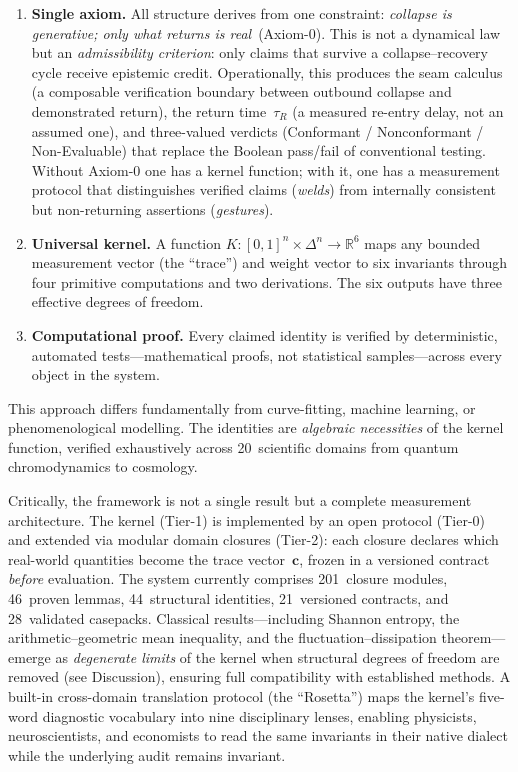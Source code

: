 \documentclass[
  aps,
  prx,
  twocolumn,
  superscriptaddress,
  nofootinbib,
  floatfix
]{revtex4-2}
\newcommand{\tR}{\tau_{\!R}}
\newcommand{\tvec}{\mathbf{c}}
\begin{document}
\begin{enumerate}[leftmargin=2em,itemsep=2pt]
\item \textbf{Single axiom.} All structure derives from one
  constraint: \emph{collapse is generative; only what returns is
  real}~(Axiom-0). This is not a dynamical law but an
  \emph{admissibility criterion}: only claims that survive a
  collapse--recovery cycle receive epistemic credit. Operationally,
  this produces the seam calculus (a composable verification
  boundary between outbound collapse and demonstrated return), the
  return time~$\tR$ (a measured re-entry delay, not an assumed one),
  and three-valued verdicts (Conformant / Nonconformant /
  Non-Evaluable) that replace the Boolean pass/fail of conventional
  testing. Without Axiom-0 one has a kernel function; with it, one
  has a measurement protocol that distinguishes verified claims
  (\emph{welds}) from internally consistent but non-returning
  assertions (\emph{gestures}).
\item \textbf{Universal kernel.} A function
  $K\!:\![0,1]^n \times \Delta^n \to \mathbb{R}^6$ maps any bounded
  measurement vector (the ``trace'') and weight vector to six
  invariants through four primitive computations and two derivations.
  The six outputs have three effective degrees of freedom.
\item \textbf{Computational proof.} Every claimed identity is verified
  by deterministic, automated tests---mathematical proofs, not
  statistical samples---across every object in the system.
\end{enumerate}

This approach differs fundamentally from curve-fitting, machine
learning, or phenomenological modelling. The identities are
\emph{algebraic necessities} of the kernel function, verified
exhaustively across 20~scientific domains from quantum
chromodynamics to cosmology.

Critically, the framework is not a single result but a complete
measurement architecture. The kernel (Tier-1) is implemented by
an open protocol (Tier-0) and extended via modular domain
closures (Tier-2): each closure declares which real-world
quantities become the trace vector~$\tvec$, frozen in a versioned
contract \emph{before} evaluation. The system currently comprises
201~closure modules, 46~proven lemmas, 44~structural identities,
21~versioned contracts, and 28~validated casepacks. Classical
results---including Shannon entropy, the arithmetic--geometric
mean inequality, and the fluctuation--dissipation
theorem---emerge as \emph{degenerate limits} of the kernel when
structural degrees of freedom are removed (see Discussion),
ensuring full compatibility with established methods. A built-in
cross-domain translation protocol (the ``Rosetta'') maps the
kernel's five-word diagnostic vocabulary into nine disciplinary
lenses, enabling physicists, neuroscientists, and economists to
read the same invariants in their native dialect while the
underlying audit remains invariant.
\end{document}
